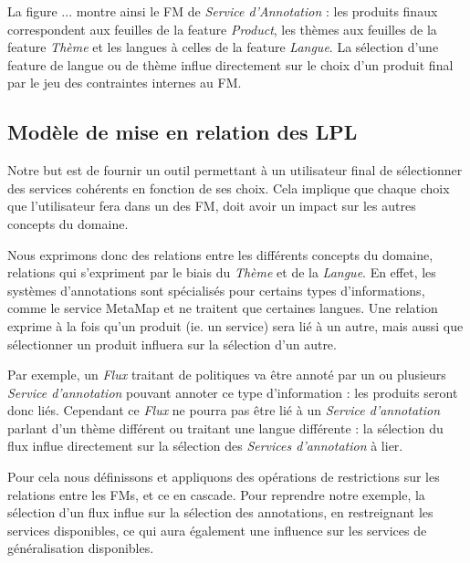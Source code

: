 \documentclass[]{easychair}
\newcommand{\comment}[4]{\par\noindent\hspace*{-0.5cm}{\parbox{\columnwidth}{\textbf{\color{#1}//#2[#3]:#4}}}\par}
\newcommand{\si}[1]{\comment{red}{}{#1}{SI}}
\begin{document}
La figure ... montre ainsi le FM de \textit{Service d'Annotation} : les produits finaux correspondent aux feuilles de la feature \textit{Product}, les thèmes aux feuilles de la feature \textit{Thème} et les langues à celles de la feature \textit{Langue}. La sélection d'une feature de langue ou de thème influe directement sur le choix d'un produit final par le jeu des contraintes internes au FM. 


\subsection{Modèle de mise en relation des LPL}
Notre but est de fournir un outil permettant à un utilisateur final de sélectionner des services cohérents en fonction de ses choix. Cela implique que chaque choix que l'utilisateur fera dans un des FM, doit avoir un impact sur les autres concepts du domaine. 

Nous exprimons donc des relations entre les différents concepts du domaine, relations qui s'expriment par le biais du \textit{Thème} et de la \textit{Langue}. En effet, les systèmes d'annotations sont spécialisés pour certains types d'informations, comme le service MetaMap \cite{MetaMap} et ne traitent que certaines langues. Une relation exprime à la fois qu'un produit (ie. un service) sera lié à un autre, mais aussi que sélectionner un produit influera sur la sélection d'un autre.

Par exemple, un \textit{Flux} traitant de politiques va être annoté par un ou plusieurs \textit{Service d'annotation} pouvant annoter ce type d'information : les produits seront donc liés. Cependant ce \textit{Flux} ne pourra pas être lié à un \textit{Service d'annotation} parlant d'un thème différent ou traitant une langue différente : la sélection du flux influe directement sur la sélection des \textit{Services d'annotation} à lier.

Pour cela nous définissons et appliquons des opérations de restrictions sur les relations entre les FMs, et ce en cascade. Pour reprendre notre exemple, la sélection d'un flux influe sur la sélection des annotations, en restreignant les services disponibles, ce qui aura également une influence sur les services de généralisation disponibles. 
\end{document}
